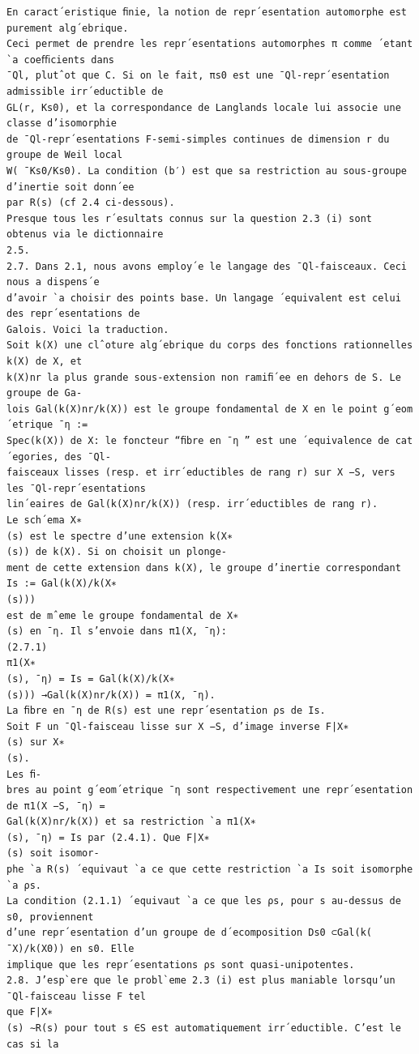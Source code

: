 \documentclass[11pt]{article}
\begin{document}
\begin{Verbatim}[breaklines=true,fontsize=\small]
En caract´eristique ﬁnie, la notion de repr´esentation automorphe est purement alg´ebrique.
Ceci permet de prendre les repr´esentations automorphes π comme ´etant `a coeﬃcients dans
¯Ql, plutˆot que C. Si on le fait, πs0 est une ¯Ql-repr´esentation admissible irr´eductible de
GL(r, Ks0), et la correspondance de Langlands locale lui associe une classe d’isomorphie
de ¯Ql-repr´esentations F-semi-simples continues de dimension r du groupe de Weil local
W( ¯Ks0/Ks0). La condition (b′) est que sa restriction au sous-groupe d’inertie soit donn´ee
par R(s) (cf 2.4 ci-dessous).
Presque tous les r´esultats connus sur la question 2.3 (i) sont obtenus via le dictionnaire
2.5.
2.7. Dans 2.1, nous avons employ´e le langage des ¯Ql-faisceaux. Ceci nous a dispens´e
d’avoir `a choisir des points base. Un langage ´equivalent est celui des repr´esentations de
Galois. Voici la traduction.
Soit k(X) une clˆoture alg´ebrique du corps des fonctions rationnelles k(X) de X, et
k(X)nr la plus grande sous-extension non ramiﬁ´ee en dehors de S. Le groupe de Ga-
lois Gal(k(X)nr/k(X)) est le groupe fondamental de X en le point g´eom´etrique ¯η :=
Spec(k(X)) de X: le foncteur “ﬁbre en ¯η ” est une ´equivalence de cat´egories, des ¯Ql-
faisceaux lisses (resp. et irr´eductibles de rang r) sur X −S, vers les ¯Ql-repr´esentations
lin´eaires de Gal(k(X)nr/k(X)) (resp. irr´eductibles de rang r).
Le sch´ema X∗
(s) est le spectre d’une extension k(X∗
(s)) de k(X). Si on choisit un plonge-
ment de cette extension dans k(X), le groupe d’inertie correspondant Is := Gal(k(X)/k(X∗
(s)))
est de mˆeme le groupe fondamental de X∗
(s) en ¯η. Il s’envoie dans π1(X, ¯η):
(2.7.1)
π1(X∗
(s), ¯η) = Is = Gal(k(X)/k(X∗
(s))) →Gal(k(X)nr/k(X)) = π1(X, ¯η).
La ﬁbre en ¯η de R(s) est une repr´esentation ρs de Is.
Soit F un ¯Ql-faisceau lisse sur X −S, d’image inverse F|X∗
(s) sur X∗
(s).
Les ﬁ-
bres au point g´eom´etrique ¯η sont respectivement une repr´esentation de π1(X −S, ¯η) =
Gal(k(X)nr/k(X)) et sa restriction `a π1(X∗
(s), ¯η) = Is par (2.4.1). Que F|X∗
(s) soit isomor-
phe `a R(s) ´equivaut `a ce que cette restriction `a Is soit isomorphe `a ρs.
La condition (2.1.1) ´equivaut `a ce que les ρs, pour s au-dessus de s0, proviennent
d’une repr´esentation d’un groupe de d´ecomposition Ds0 ⊂Gal(k( ¯X)/k(X0)) en s0. Elle
implique que les repr´esentations ρs sont quasi-unipotentes.
2.8. J’esp`ere que le probl`eme 2.3 (i) est plus maniable lorsqu’un ¯Ql-faisceau lisse F tel
que F|X∗
(s) ∼R(s) pour tout s ∈S est automatiquement irr´eductible. C’est le cas si la


\end{Verbatim}
\end{document}

